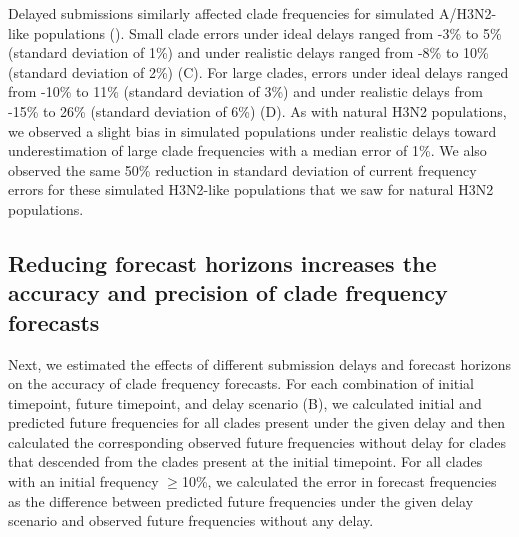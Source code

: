\documentclass[9pt,lineno]{elife}
\begin{document}
Delayed submissions similarly affected clade frequencies for simulated A/H3N2-like populations ().
Small clade errors under ideal delays ranged from -3\% to 5\% (standard deviation of 1\%) and under realistic delays ranged from -8\% to 10\% (standard deviation of 2\%) (C).
For large clades, errors under ideal delays ranged from -10\% to 11\% (standard deviation of 3\%) and under realistic delays from -15\% to 26\% (standard deviation of 6\%) (D).
As with natural H3N2 populations, we observed a slight bias in simulated populations under realistic delays toward underestimation of large clade frequencies with a median error of 1\%.
We also observed the same 50\% reduction in standard deviation of current frequency errors for these simulated H3N2-like populations that we saw for natural H3N2 populations.

\subsection{Reducing forecast horizons increases the accuracy and precision of clade frequency forecasts}

Next, we estimated the effects of different submission delays and forecast horizons on the accuracy of clade frequency forecasts.
For each combination of initial timepoint, future timepoint, and delay scenario (B), we calculated initial and predicted future frequencies for all clades present under the given delay and then calculated the corresponding observed future frequencies without delay for clades that descended from the clades present at the initial timepoint.
For all clades with an initial frequency $\ge$10\%, we calculated the error in forecast frequencies as the difference between predicted future frequencies under the given delay scenario and observed future frequencies without any delay.
\end{document}
